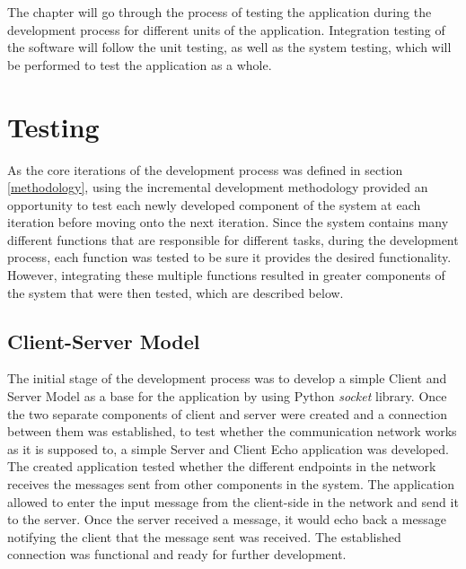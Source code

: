 \documentclass[10pt]{report}
\begin{document}
The chapter will go through the process of testing the application during the development process for different units of the application. Integration testing of the software will follow the unit testing, as well as the system testing, which will be performed to test the application as a whole.
\newline

\section{Testing} \label{testing}

\noindent As the core iterations of the development process was defined in section \ref{methodology}, using the incremental development methodology provided an opportunity to test each newly developed component of the system at each iteration before moving onto the next iteration. Since the system contains many different functions that are responsible for different tasks, during the development process, each function was tested to be sure it provides the desired functionality. However, integrating these multiple functions resulted in greater components of the system that were then tested, which are described below.

\subsection*{Client-Server Model}
The initial stage of the development process was to develop a simple Client and Server Model as a base for the application by using Python \textit{socket} library. Once the two separate components of client and server were created and a connection between them was established, to test whether the communication network works as it is supposed to, a simple Server and Client Echo application was developed. The created application tested whether the different endpoints in the network receives the messages sent from other components in the system. The application allowed to enter the input message from the client-side in the network and send it to the server. Once the server received a message, it would echo back a message notifying the client that the message sent was received. The established connection was functional and ready for further development.
\end{document}
